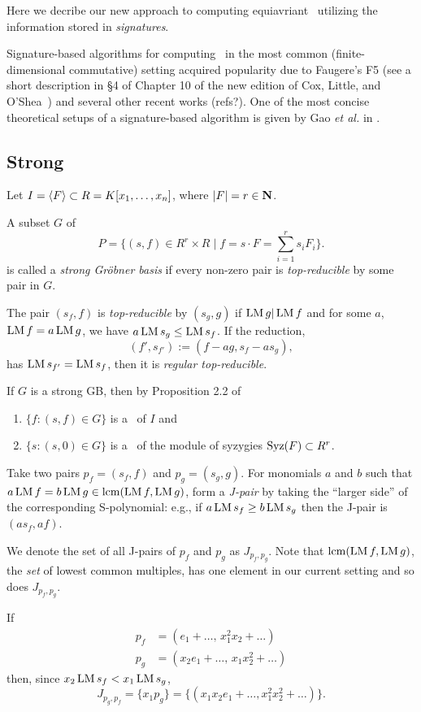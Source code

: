 Here we decribe our new approach to computing equiavriant \GBs\ utilizing the information stored in {\em signatures}. 

Signature-based algorithms for computing \GBs\ in the most common (finite-dimensional commutative) setting acquired popularity due to Faugere's F5 (see a short description in \S 4 of Chapter 10 of the new edition of Cox, Little, and O'Shea~\cite{Cox-Little-OShea:I-V-A}) and several other recent works (refs?).      
One of the most concise theoretical setups of a signature-based algorithm is given by Gao {\em et al.} in \cite{Gao-Volny-Wang:signature-GBs}.  

\subsection{Strong \GB}

Let $I=\langle F \rangle \subset R=K[x_1,\ldots,x_n]$, where $|F|=r\in\mathbf N$.

A subset $G$ of 
\[
P = \{(s,f)\in R^r\times R \mid f=s\cdot F = \sum_{i=1}^r s_iF_i\}.
\]
is called a {\em strong Gr\"obner basis} if every non-zero pair is {\em top-reducible} by some pair in $G$.

The pair $(s_f,f)$ is {\em top-reducible} by $(s_g,g)$ if $\operatorname{LM} g |\operatorname{LM} f$ and 
for some $a$, $\operatorname{LM} f = a \operatorname{LM} g$, we have $a\operatorname{LM} s_g\leq \operatorname{LM} s_f$.  If the reduction,
\[
(f',s_{f'}) := (f-ag,s_f-as_g),
\]
has $\operatorname{LM} s_{f'} = \operatorname{LM} s_f$, then it is {\em regular top-reducible}.

If $G$ is a strong GB, then by Proposition 2.2 of~\cite{Gao-Volny-Wang:signature-GBs}
\begin{enumerate}
   \item $\{f:(s,f)\in G\}$ is a \GB\ of $I$ and 
   \item $\{s:(s,0)\in G\}$ is a \GB\ of the module of syzygies $\operatorname{Syz}(F) \subset R^r$.
\end{enumerate}
   
Take two pairs $p_f=(s_f,f)$ and $p_g=(s_g,g)$. For monomials $a$ and $b$ such that $a\operatorname{LM} f = b\operatorname{LM} g \in \operatorname{lcm}(\operatorname{LM} f,\operatorname{LM} g)$, form a {\em J-pair} by taking the ``larger side'' of the corresponding S-polynomial: e.g., if $a\operatorname{LM} s_f \geq b\operatorname{LM} s_g$ then the J-pair is $(as_f,af)$.

We denote the set of all J-pairs of $p_f$ and $p_g$ as $J_{p_f,p_g}$. Note that $\operatorname{lcm}(\operatorname{LM} f,\operatorname{LM} g)$, the {\em set} of lowest common multiples, has one element in our current setting and so does $J_{p_f,p_g}$.  

\begin{example} If 
\begin{align*}
p_f &= (e_1+\ldots,\,x_1^2x_2+\ldots)\\
p_g &= (x_2e_1+\ldots,\,x_1x_2^2+\ldots)
\end{align*}
then, since $x_2\operatorname{LM} s_f < x_1\operatorname{LM} s_g$,
\[
J_{p_g,p_f} = \{x_1p_g\} = \{(x_1x_2e_1+\ldots, x_1^2x_2^2+\ldots)\}.
\]
\end{example}

